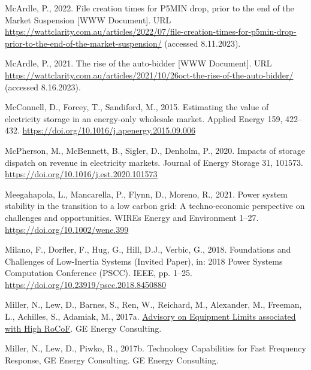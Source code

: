 \documentclass[12pt,a4paper,]{report}
\newlength{\cslhangindent}
\newenvironment{CSLReferences}[2] %
 {%
  \setlength{\parindent}{0pt}
  \ifodd #1 \everypar{\setlength{\hangindent}{\cslhangindent}}\ignorespaces\fi
  \ifnum #2 > 0
  \setlength{\parskip}{#2\baselineskip}
  \fi
 }%
 {}
\begin{document}
\begin{CSLReferences}{1}{0}
\leavevmode{}%
McArdle, P., 2022. File creation times for {P5MIN} drop, prior to the
end of the {Market Suspension} {[}WWW Document{]}. URL
\url{https://wattclarity.com.au/articles/2022/07/file-creation-times-for-p5min-drop-prior-to-the-end-of-the-market-suspension/}
(accessed 8.11.2023).

\leavevmode{}%
McArdle, P., 2021. The rise of the auto-bidder {[}WWW Document{]}. URL
\url{https://wattclarity.com.au/articles/2021/10/26oct-the-rise-of-the-auto-bidder/}
(accessed 8.16.2023).

\leavevmode{}%
McConnell, D., Forcey, T., Sandiford, M., 2015. Estimating the value of
electricity storage in an energy-only wholesale market. Applied Energy
159, 422--432. \url{https://doi.org/10.1016/j.apenergy.2015.09.006}

\leavevmode{}%
McPherson, M., McBennett, B., Sigler, D., Denholm, P., 2020. Impacts of
storage dispatch on revenue in electricity markets. Journal of Energy
Storage 31, 101573. \url{https://doi.org/10.1016/j.est.2020.101573}

\leavevmode{}%
Meegahapola, L., Mancarella, P., Flynn, D., Moreno, R., 2021. Power
system stability in the transition to a low carbon grid: {A}
techno‐economic perspective on challenges and opportunities. WIREs
Energy and Environment 1--27. \url{https://doi.org/10.1002/wene.399}

\leavevmode{}%
Milano, F., Dorfler, F., Hug, G., Hill, D.J., Verbic, G., 2018.
Foundations and {Challenges} of {Low-Inertia Systems} ({Invited Paper}),
in: 2018 {Power Systems Computation Conference} ({PSCC}). {IEEE}, pp.
1--25. \url{https://doi.org/10.23919/pscc.2018.8450880}

\leavevmode{}%
Miller, N., Lew, D., Barnes, S., Ren, W., Reichard, M., Alexander, M.,
Freeman, L., Achilles, S., Adamiak, M., 2017a.
\href{https://www.aemo.com.au/-/media/Files/Electricity/NEM/Security_and_Reliability/Reports/2017/20170904-GE-RoCoF-Advisory}{Advisory
on {Equipment Limits} associated with {High RoCoF}}. {GE Energy
Consulting}.

\leavevmode{}%
Miller, N., Lew, D., Piwko, R., 2017b. Technology {Capabilities} for
{Fast Frequency Response}, GE Energy Consulting. {GE Energy Consulting}.


\end{CSLReferences}
\end{document}
